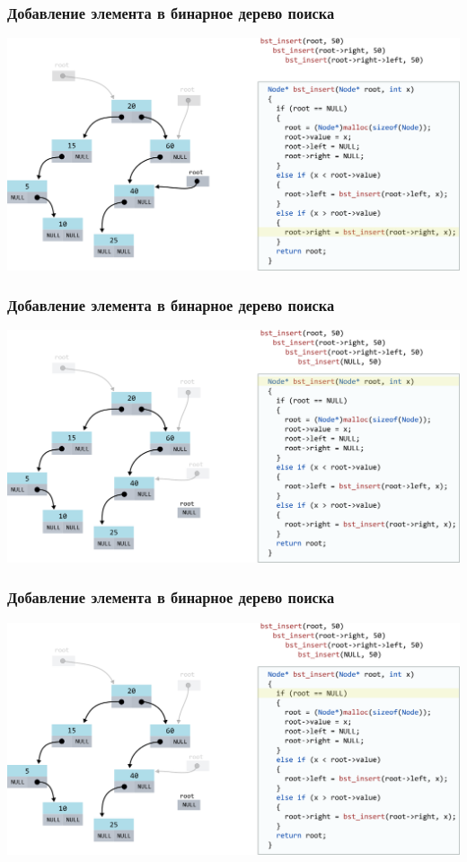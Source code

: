 \documentclass[10pt,pdf,hyperref={unicode}]{beamer}
\begin{document}
\begin{frame}[fragile]
\frametitle{Добавление элемента в бинарное дерево поиска}
\begin{center}
\includegraphics[width=\imageSizeMult\linewidth]{../images/codetree/codetree9.png}
\end{center}
\end{frame}

\begin{frame}[fragile]
\frametitle{Добавление элемента в бинарное дерево поиска}
\begin{center}
\includegraphics[width=\imageSizeMult\linewidth]{../images/codetree/codetree10.png}
\end{center}
\end{frame}

\begin{frame}[fragile]
\frametitle{Добавление элемента в бинарное дерево поиска}
\begin{center}
\includegraphics[width=\imageSizeMult\linewidth]{../images/codetree/codetree11.png}
\end{center}
\end{frame}
\end{document}
